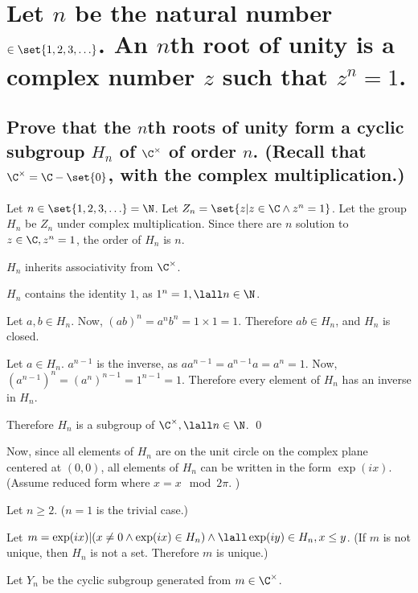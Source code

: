 \section[Problem 3]{Let $n$ be the natural number $\in\set{1,2,3,\hdots}$.
    An $n$th root of unity is a complex number $z$ such that $z^n = 1$.}
    \subsection[(i)]{Prove that the $n$th roots of unity form a cyclic subgroup 
        $H_n$ of $\C^\times$ of order $n$.
        (Recall that $\C^\times = \C - \set{0}$, with the complex multiplication.)}

        Let $n \in \set{1,2,3,\hdots} = \N$.
        Let $Z_n = \set{z | z \in \C \land z^n = 1}$.
        Let the group $H_n$ be $Z_n$ under complex multiplication.
        Since there are $n$ solution to $z \in \C, z^n = 1$,
        the order of $H_n$ is $n$.

        $H_n$ inherits associativity from $\C^\times$.

        $H_n$ contains the identity $1$, as $1^n = 1, \lall n \in \N$.

        Let $a,b \in H_n$. Now, $(ab)^n = a^nb^n = 1 \times 1 = 1$.
        Therefore $ab \in H_n$, and $H_n$ is closed.

        Let $a \in H_n$. $a^{n-1}$ is the inverse,
        as $aa^{n-1} = a^{n-1}a = a^n = 1$.
        Now, $\left(a^{n-1}\right)^n = \left(a^n\right)^{n-1} = 1^{n-1} = 1$.
        Therefore every element of $H_n$ has an inverse in $H_n$.

        Therefore $H_n$ is a subgroup of $\C^\times, \lall n \in \N$.
        \qed
        
        Now, since all elements of $H_n$ are on the unit circle on the complex plane centered at $(0,0)$,
        all elements of $H_n$ can be written in the form $\exp(ix)$.
        (Assume reduced form where $x = x\mod 2\pi$.
        )

        Let $n \geq 2$. ($n = 1$ is the trivial case.)

        Let $m = \exp(ix) |( x \neq 0 \land \exp(ix) \in H_n) \land \lall \exp(iy) \in H_n, x \leq y$.
        (If $m$ is not unique, then $H_n$ is not a set. Therefore $m$ is unique.)

        Let $Y_n$ be the cyclic subgroup generated from $m \in \C^\times$.

